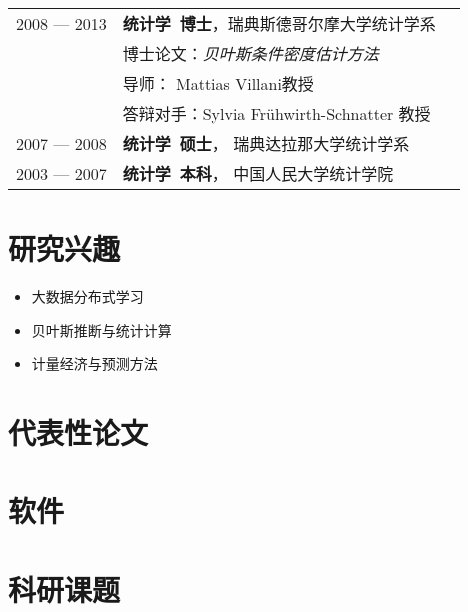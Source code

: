 \documentclass[twoside,a4paper,10pt]{amsart}
\begin{document}
\begin{tabular}{ l  p{} l}
  2008 --- 2013 &\textbf{统计学~博士}，瑞典斯德哥尔摩大学统计学系\\
  & 博士论文：\emph{贝叶斯条件密度估计方法}\\
  & 导师： Mattias Villani教授\\
  & 答辩对手：Sylvia Frühwirth-Schnatter 教授\\

  2007 --- 2008 & \textbf{统计学~硕士}， 瑞典达拉那大学统计学系\\

  2003 --- 2007 & \textbf{统计学~本科}， 中国人民大学统计学院\\
\end{tabular}

\section*{研究兴趣}

\begin{itemize}
\item 大数据分布式学习
\item 贝叶斯推断与统计计算
\item 计量经济与预测方法

\end{itemize}
\section*{代表性论文}
\nocite{wang2021uncertainty}
\nocite{kang2020deja}
\nocite{hao2020bilinear}
\nocite{kang2020gratis}
\nocite{kalesan2020intersections}
\nocite{bailey2019changes}
\nocite{li2019credit}
\nocite{li2018improving}
\nocite{pino2018cohort}
\nocite{li2016distributed}
\nocite{li2013bayesian}
\nocite{li2013efficient}
\nocite{li2011modeling}
\nocite{li2010flexible}
\printbibliography[heading=none,  nottype=software]

\section*{软件}
\nocite{gratis}
\nocite{spark-dlsa}
\printbibliography[heading=none, type=software]

\section*{科研课题}
\end{document}
